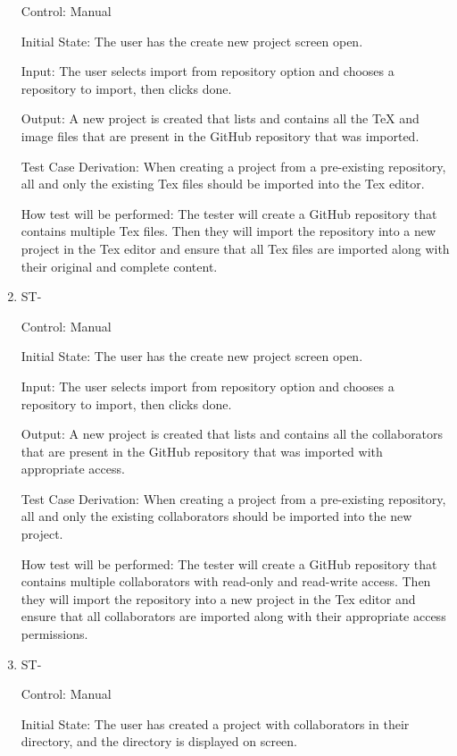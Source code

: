 \documentclass[12pt, titlepage]{article}
\newcounter{TESTID}
\newcommand\TESTNUM{\stepcounter{TESTID}\theTESTID}
\begin{document}
\begin{enumerate}
		Control: Manual
		
		Initial State: The user has the create new project screen open.
		
		Input: The user selects import from repository option and chooses a repository to import, then clicks done.
		
		Output: A new project is created that lists and contains all the TeX and image files that are present in the GitHub repository that was imported.
		
		Test Case Derivation: When creating a project from a pre-existing repository, all and only the existing Tex files should be imported into the Tex editor.
		
		How test will be performed: The tester will create a GitHub repository that contains multiple Tex files. Then they will import the repository into a new project in the Tex editor and ensure that all Tex files are imported along with their original and complete content.
		
		\item{ST-\TESTNUM\\}
		
		Control: Manual
		
		Initial State: The user has the create new project screen open.
		
		Input: The user selects import from repository option and chooses a repository to import, then clicks done.
		
		Output: A new project is created that lists and contains all the collaborators that are present in the GitHub repository that was imported with appropriate access.
		
		Test Case Derivation: When creating a project from a pre-existing repository, all and only the existing collaborators should be imported into the new project.
		
		How test will be performed: The tester will create a GitHub repository that contains multiple collaborators with read-only and read-write access. Then they will import the repository into a new project in the Tex editor and ensure that all collaborators are imported along with their appropriate access permissions.
		
		\item{ST-\TESTNUM\\}
		
		Control: Manual
		
		Initial State: The user has created a project with collaborators in their directory, and the directory is displayed on screen.
		

\end{enumerate}
\end{document}
